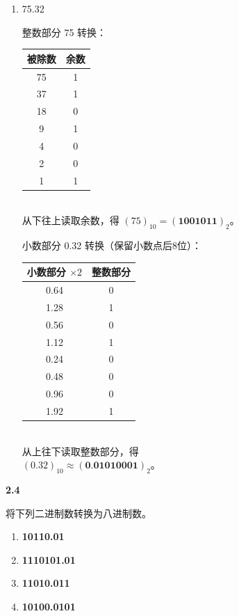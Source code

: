 \documentclass[10pt, a4paper]{article}
\newcommand{\question}[2]{
    \vspace{2ex}\noindent\textbf{#1}\ {\kaishu #2} \par\vspace{1ex}
}
\begin{document}
{\begin{enumerate}
    \item 75.32 \\
    \begin{minipage}[t]{0.48\textwidth}
        整数部分 75 转换：\\
        \begin{tabular}{|c|c|}
            \hline
            被除数 & 余数 \\ \hline
            75 & 1 \\ \hline
            37 & 1 \\ \hline
            18 & 0 \\ \hline
            9  & 1 \\ \hline
            4  & 0 \\ \hline
            2  & 0 \\ \hline
            1  & 1 \\ \hline
        \end{tabular}\\
        从下往上读取余数，得 $(75)_{10}=(\textbf{1001011})_2$。
    \end{minipage}
    \hfill
    \begin{minipage}[t]{0.48\textwidth}
        小数部分 0.32 转换（保留小数点后8位）：\\
        \begin{tabular}{|c|c|}
            \hline
            小数部分 $\times 2$ & 整数部分 \\ \hline
            0.64 & 0 \\ \hline
            1.28 & 1 \\ \hline
            0.56 & 0 \\ \hline
            1.12 & 1 \\ \hline
            0.24 & 0 \\ \hline
            0.48 & 0 \\ \hline
            0.96 & 0 \\ \hline
            1.92 & 1 \\ \hline
        \end{tabular}\\
        从上往下读取整数部分，得 \\ $(0.32)_{10}\approx(\textbf{0.01010001})_2$。
    \end{minipage}
    
\end{enumerate}
}

\question{2.4}{
将下列二进制数转换为八进制数。
\begin{enumerate}
	\item \textbf{10110.01}
	\item \textbf{1110101.01}
	\item \textbf{11010.011}
	\item \textbf{10100.0101}
\end{enumerate}
}
\end{document}
